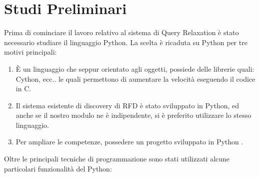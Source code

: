 \section{Studi Preliminari}
Prima di cominciare il lavoro relativo al sistema di Query Relaxation è stato necessario studiare il linguaggio Python.
La scelta è ricaduta su Python per tre motivi principali:
\begin{enumerate}
    \item È un linguaggio che seppur orientato agli oggetti, possiede delle librerie quali: Cython, ecc.. le quali permettono di aumentare la velocità eseguendo il codice in C.
    \item Il sistema esistente di discovery di RFD è stato sviluppato in Python, ed anche se il nostro modulo ne è indipendente, si è preferito utilizzare lo stesso linguaggio.
    \item Per ampliare le competenze, possedere un progetto sviluppato in Python .
\end{enumerate}
Oltre le principali tecniche di programmazione sono stati utilizzati alcune particolari funzionalità del Python:

